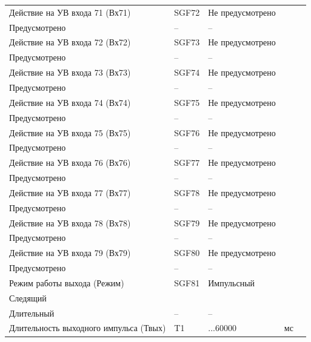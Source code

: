 \begin{longtable}{|>{\centering\arraybackslash}m{5.3cm}|>{\centering\arraybackslash}m{3.3cm}|>{\centering\arraybackslash}m{4.2cm}|>{\centering\arraybackslash}m{1.8cm}|>{\centering\arraybackslash}m{1cm}|}
\hline
\centering Действие на УВ входа 71 (Вх71)  & \centering SGF72 & \centering Не предусмотрено \\ Предусмотрено & \centering -- & \centering \arraybackslash -- \\
\hline
\centering Действие на УВ входа 72 (Вх72)  & \centering SGF73 & \centering Не предусмотрено \\ Предусмотрено & \centering -- & \centering \arraybackslash -- \\
\hline
\centering Действие на УВ входа 73 (Вх73)  & \centering SGF74 & \centering Не предусмотрено \\ Предусмотрено & \centering -- & \centering \arraybackslash -- \\
\hline
\centering Действие на УВ входа 74 (Вх74)  & \centering SGF75 & \centering Не предусмотрено \\ Предусмотрено & \centering -- & \centering \arraybackslash -- \\
\hline
\centering Действие на УВ входа 75 (Вх75)  & \centering SGF76 & \centering Не предусмотрено \\ Предусмотрено & \centering -- & \centering \arraybackslash -- \\
\hline
\centering Действие на УВ входа 76 (Вх76)  & \centering SGF77 & \centering Не предусмотрено \\ Предусмотрено & \centering -- & \centering \arraybackslash -- \\
\hline
\centering Действие на УВ входа 77 (Вх77)  & \centering SGF78 & \centering Не предусмотрено \\ Предусмотрено & \centering -- & \centering \arraybackslash -- \\
\hline
\centering Действие на УВ входа 78 (Вх78)  & \centering SGF79 & \centering Не предусмотрено \\ Предусмотрено & \centering -- & \centering \arraybackslash -- \\
\hline
\centering Действие на УВ входа 79 (Вх79)  & \centering SGF80 & \centering Не предусмотрено \\ Предусмотрено & \centering -- & \centering \arraybackslash -- \\
\hline
\centering Режим работы выхода (Режим)  & \centering SGF81 & \centering Импульсный \\ Следящий \\ Длительный & \centering -- & \centering \arraybackslash -- \\
\hline
\centering Длительность выходного импульса (Твых)  & \centering T1 & \centering 50...60000 & \centering мс & \centering \arraybackslash 10 \\

\end{longtable}
